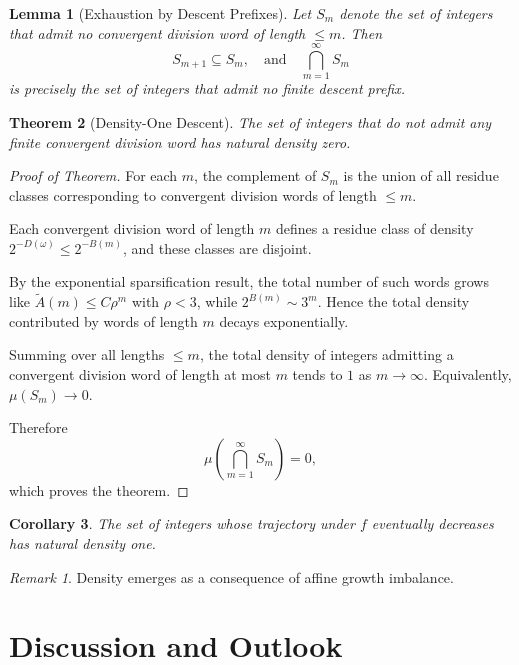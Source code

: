 \documentclass[12pt, oneside]{article}
\numberwithin{equation}{section}
\theoremstyle{definition}
\theoremstyle{plain}
\newtheorem{theorem}{Theorem}[section]
\newtheorem{lemma}[theorem]{Lemma}
\newtheorem{corollary}[theorem]{Corollary}
\theoremstyle{remark}
\newtheorem*{remark}{Remark}
\begin{document}
\begin{lemma}[Exhaustion by Descent Prefixes]
Let $S_m$ denote the set of integers that admit no convergent division word
of length $\le m$. Then
\[
S_{m+1} \subseteq S_m,
\quad\text{and}\quad
\bigcap_{m=1}^\infty S_m
\]
is precisely the set of integers that admit no finite descent prefix.
\end{lemma}

\begin{theorem}[Density-One Descent]
The set of integers that do not admit any finite convergent division word
has natural density zero.
\end{theorem}

\begin{proof}[Proof of Theorem]
For each $m$, the complement of $S_m$ is the union of all residue classes
corresponding to convergent division words of length $\le m$.

Each convergent division word of length $m$ defines a residue class
of density $2^{-D(\omega)} \le 2^{-B(m)}$, and these classes are disjoint.

By the exponential sparsification result, the total number of such words
grows like $\widetilde A(m) \le C \rho^m$ with $\rho < 3$, while
$2^{B(m)} \sim 3^m$. Hence the total density contributed by words of length
$m$ decays exponentially.

Summing over all lengths $\le m$, the total density of integers admitting
a convergent division word of length at most $m$ tends to $1$ as $m \to \infty$.
Equivalently, $\mu(S_m) \to 0$.

Therefore
\[
\mu\!\left(\bigcap_{m=1}^\infty S_m\right) = 0,
\]
which proves the theorem.
\end{proof}

\begin{corollary}
The set of integers whose trajectory under $f$ eventually decreases
has natural density one.
\end{corollary}

\begin{remark}
Density emerges as a consequence of affine growth imbalance.
\end{remark}

\section{Discussion and Outlook}


\clearpage


\end{document}

